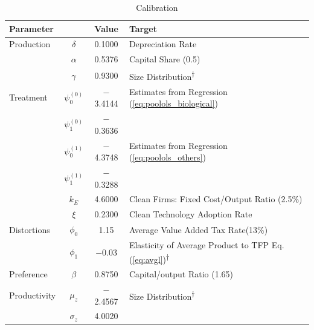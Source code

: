 \documentclass[AEJ]{AEA}
\begin{document}
\begin{table}[t]
\footnotesize
\centering
\caption{Calibration}
\begin{tabular}{lccl}
    \hline \hline
    Parameter     &                   & Value         & Target                                                      \\
    \hline
    Production    & $\delta$          & 0.1000        & Depreciation Rate                                           \\
                  & $\alpha$          & 0.5376        & Capital Share (0.5)                                         \\
                  & $\gamma$          & 0.9300        & Size Distribution\textsuperscript{$\dagger$}                \\
    \hline
    Treatment     & $\psi_0^{(0)}$    & $-$3.4144     & Estimates from Regression (\ref{eq:poolols_biological})     \\
                  & $\psi_1^{(0)}$    & $-$0.3636     &                                                             \\
                  & $\psi_0^{(1)}$    & $-$4.3748     & Estimates from Regression (\ref{eq:poolols_others})         \\
                  & $\psi_1^{(1)}$    & $-$0.3288     &                                                             \\
                  & $k_E$             & 4.6000        & Clean Firms: Fixed Cost/Output Ratio (2.5\%)                \\
                  & $\xi$             & 0.2300        & Clean Technology Adoption Rate                              \\
    \hline
    Distortions   & $\phi_0$          & 1.15          & Average Value Added Tax Rate(13\%)                          \\
                  & $\phi_1$          & $-$0.03       & Elasticity of Average Product to TFP Eq. (\ref{eq:avgl})\textsuperscript{$\dagger$}    \\
    Preference    & $\beta$           & 0.8750        & Capital/output Ratio (1.65)                                 \\
    \hline
    Productivity  & $\mu_z$           & $-$2.4567     & Size Distribution\textsuperscript{$\dagger$}                \\
                  & $\sigma_z$        & 4.0020        &                                                             \\

\end{tabular}
\end{table}
\end{document}
